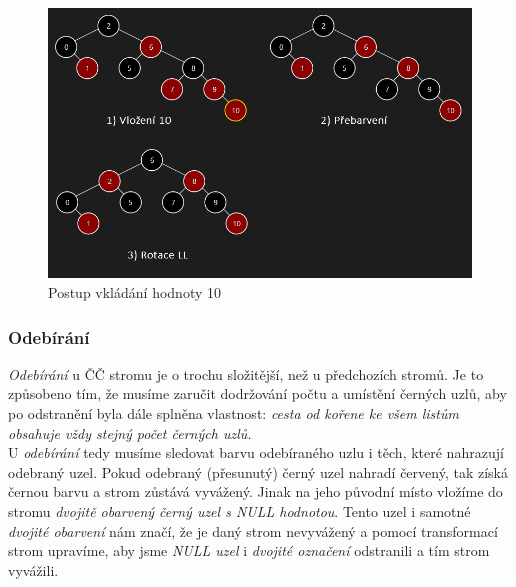 \documentclass[
  biblatex=false,
  font=serif,
  glossaries=false,
  tables=false,
  theorems=false,
  index
]{kidiplom}
\begin{document}
\begin{figure}[h!]
\centering
	\includegraphics[scale=0.57]{obrazky/24CCVlozeni.png}
	\caption{Postup vkládání hodnoty 10}
\end{figure}

\subsubsection{Odebírání}
\indent\indent \textit{Odebírání} u ČČ stromu je o trochu složitější, než u předchozích stromů. Je to způsobeno tím, že musíme zaručit dodržování počtu a umístění černých uzlů, aby po odstranění byla dále splněna vlastnost: \textit{cesta od kořene ke všem listům obsahuje vždy stejný počet černých uzlů.}\\
\indent U \textit{odebírání} tedy musíme sledovat barvu odebíraného uzlu i těch, které nahrazují odebraný uzel. Pokud odebraný (přesunutý) černý uzel nahradí červený, tak získá černou barvu a strom zůstává vyvážený. Jinak na jeho původní místo vložíme do stromu \textit{dvojitě obarvený černý uzel s NULL hodnotou}. Tento uzel i samotné \textit{dvojité obarvení} nám značí, že je daný strom nevyvážený a pomocí transformací strom upravíme, aby jsme \textit{NULL uzel} i \textit{dvojité označení} odstranili a tím strom vyvážili.\\
\end{document}
